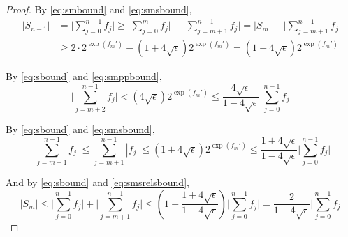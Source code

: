 \begin{proof}
      By  \eqref{eq:smbound} and \eqref{eq:smsbound},
      \begin{align}
        |S_{n-1}| & = \bigl|\sum\limits_{j = 0}^{n - 1} f_j\bigr| \geq \bigl|\sum\limits_{j = 0}^{m} f_j\bigr| - \bigl|\sum\limits_{j = m + 1}^{n - 1} f_j\bigr| = |S_m| - \bigl|\sum\limits_{j = m + 1}^{n - 1} f_j\bigr| \nonumber \\
        & \geq 2 \cdot 2^{\exp(f_{m}')} - \left(1 + 4 \sqrt\epsilon\right) 2^{\exp(f_m')} = \left(1 - 4 \sqrt\epsilon\right) 2^{\exp(f_m')}
        \label{eq:sbound}
      \end{align}

      By  \eqref{eq:sbound} and \eqref{eq:smppbound},
      \begin{equation}
        \bigl|\sum \limits_{j = m + 2}^{n - 1} f_j\bigr| < \left(4 \sqrt{\epsilon}\right) 2^{\exp(f_m')} \leq \frac{4 \sqrt\epsilon}{1 - 4  \sqrt\epsilon}\bigl|\sum\limits_{j = 0}^{n - 1}f_j\bigr|
        \label{eq:smpprelsbound}
      \end{equation}

      By  \eqref{eq:sbound} and \eqref{eq:smsbound},
      \begin{equation}
        \bigl|\sum\limits_{j = m + 1}^{n - 1}f_j\bigr| \leq \sum\limits_{j = m + 1}^{n - 1}|f_j| \leq \left(1 + 4  \sqrt\epsilon\right)2^{\exp(f_m')}\leq \frac{1 + 4  \sqrt\epsilon}{1 - 4  \sqrt\epsilon}\bigl|\sum\limits_{j = 0}^{n - 1}f_j\bigr|
        \label{eq:smsrelsbound}
      \end{equation}

      And by \eqref{eq:sbound} and \eqref{eq:smsrelsbound},
      \begin{equation}
        |S_m| \leq \bigl|\sum\limits_{j = 0}^{n - 1}f_j\bigr| + \bigl|\sum\limits_{j = m + 1}^{n - 1} f_j\bigr|
            \leq \left(1 + \frac{1 + 4\sqrt\epsilon}{1 - 4\sqrt\epsilon}\right)\bigl|\sum_{j = 0}^{n - 1}f_j\bigr|
            = \frac{2}{1 - 4  \sqrt\epsilon}\bigl|\sum\limits_{j = 0}^{n - 1}f_j\bigr|
        \label{eq:smrelsbound}
      \end{equation}


\end{proof}
